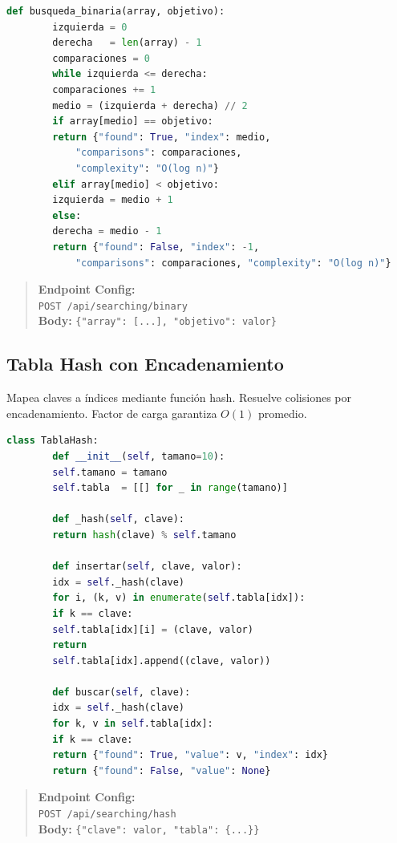 \documentclass[12pt, letterpaper]{article}
\begin{document}
	\begin{lstlisting}[language=Python, caption={Implementacion de Busqueda Binaria}]
		def busqueda_binaria(array, objetivo):
		izquierda = 0
		derecha   = len(array) - 1
		comparaciones = 0
		while izquierda <= derecha:
		comparaciones += 1
		medio = (izquierda + derecha) // 2
		if array[medio] == objetivo:
		return {"found": True, "index": medio,
			"comparisons": comparaciones,
			"complexity": "O(log n)"}
		elif array[medio] < objetivo:
		izquierda = medio + 1
		else:
		derecha = medio - 1
		return {"found": False, "index": -1,
			"comparisons": comparaciones, "complexity": "O(log n)"}
	\end{lstlisting}
	
	\begin{quote}
		\textbf{Endpoint Config:} \\
		\texttt{POST /api/searching/binary} \\
		\textbf{Body:} \texttt{\{"array": [...], "objetivo": valor\}}
	\end{quote}
	
	\subsection{Tabla Hash con Encadenamiento}
	Mapea claves a índices mediante función hash. Resuelve colisiones por encadenamiento. Factor de carga garantiza $O(1)$ promedio.
	
	\begin{lstlisting}[language=Python, caption={Tabla Hash con Encadenamiento}]
		class TablaHash:
		def __init__(self, tamano=10):
		self.tamano = tamano
		self.tabla  = [[] for _ in range(tamano)]
		
		def _hash(self, clave):
		return hash(clave) % self.tamano
		
		def insertar(self, clave, valor):
		idx = self._hash(clave)
		for i, (k, v) in enumerate(self.tabla[idx]):
		if k == clave:
		self.tabla[idx][i] = (clave, valor)
		return
		self.tabla[idx].append((clave, valor))
		
		def buscar(self, clave):
		idx = self._hash(clave)
		for k, v in self.tabla[idx]:
		if k == clave:
		return {"found": True, "value": v, "index": idx}
		return {"found": False, "value": None}
	\end{lstlisting}
	
	\begin{quote}
		\textbf{Endpoint Config:} \\
		\texttt{POST /api/searching/hash} \\
		\textbf{Body:} \texttt{\{"clave": valor, "tabla": \{...\}\}}
	\end{quote}
	
\end{document}
